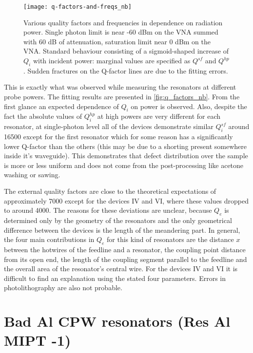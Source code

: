 \documentclass[12pt]{article}
\numberwithin{equation}{section}
\numberwithin{figure}{section}
\begin{document}
\begin{figure}

\hspace{-0.7cm}
\texttt{[image: q-factors-and-freqs\_nb]}
\caption{Various quality factors and frequencies in dependence on radiation power. Single photon limit is near -60 dBm on the VNA summed with 60 dB of attenuation, saturation limit near 0 dBm on the VNA. Standard behaviour consisting of a sigmoid-shaped increase of $Q_i$ with incident power: marginal values are specified as $Q^{sf}$ and $Q^{hp}$. Sudden fractures on the Q-factor lines are due to the fitting errors.}
\label{fig:q_factors_nb}
\end{figure}

This is exactly what was observed while measuring the resonators at different probe powers. The fitting results are presented in \autoref{fig:q_factors_nb}. From the first glance an expected dependence of $Q_i$ on power is observed. Also, despite the fact the absolute values of $Q_i^{hp}$ at high powers are very different for each resonator, at single-photon level all of the devices demonstrate similar $Q_i^{sf}$ around 16500 except for the first resonator which for some reason has a significantly lower Q-factor than the others (this may be due to a shorting present somewhere inside it's waveguide). This demonstrates that defect distribution over the sample is more or less uniform and does not come from the post-processing like acetone washing or sawing.

The external quality factors are close to the theoretical expectations of approximately 7000 except for the devices IV and VI, where these values dropped to around 4000. The reasons for these deviations are unclear, because $Q_e$ is determined only by the geometry of the resonators and the only geometrical difference between the devices is the length of the meandering part. In general, the four main contributions in $Q_e$ for this kind of resonators are the distance $x$ between the hotwires of the feedline and a resonator, the coupling point distance from its open end, the length of the coupling segment parallel to the feedline and the overall area of the resonator's central wire. For the devices IV and VI it is difficult to find an explanation using the stated four parameters. Errors in photolithography are also not probable.

\section{Bad Al CPW resonators (Res Al MIPT -1)}
\end{document}
